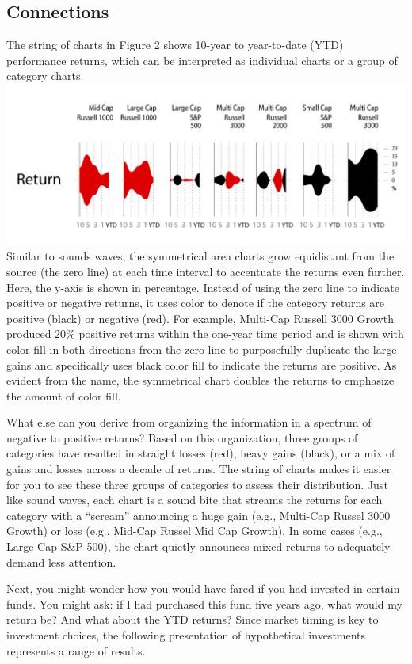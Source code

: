 \documentclass[]{book}
\theoremstyle{definition}
\theoremstyle{definition}
\theoremstyle{definition}
\theoremstyle{remark}
\begin{document}
\subsection{Connections}\label{connections}

The string of charts in Figure 2 shows 10-year to year-to-date (YTD)
performance returns, which can be interpreted as individual charts or a
group of category charts. \includegraphics{images/pattern-2.jpg} Similar
to sounds waves, the symmetrical area charts grow equidistant from the
source (the zero line) at each time interval to accentuate the returns
even further. Here, the y-axis is shown in percentage. Instead of using
the zero line to indicate positive or negative returns, it uses color to
denote if the category returns are positive (black) or negative (red).
For example, Multi-Cap Russell 3000 Growth produced 20\% positive
returns within the one-year time period and is shown with color fill in
both directions from the zero line to purposefully duplicate the large
gains and specifically uses black color fill to indicate the returns are
positive. As evident from the name, the symmetrical chart doubles the
returns to emphasize the amount of color fill.

What else can you derive from organizing the information in a spectrum
of negative to positive returns? Based on this organization, three
groups of categories have resulted in straight losses (red), heavy gains
(black), or a mix of gains and losses across a decade of returns. The
string of charts makes it easier for you to see these three groups of
categories to assess their distribution. Just like sound waves, each
chart is a sound bite that streams the returns for each category with a
``scream'' announcing a huge gain (e.g., Multi-Cap Russel 3000 Growth)
or loss (e.g., Mid-Cap Russel Mid Cap Growth). In some cases (e.g.,
Large Cap S\&P 500), the chart quietly announces mixed returns to
adequately demand less attention.

Next, you might wonder how you would have fared if you had invested in
certain funds. You might ask: if I had purchased this fund five years
ago, what would my return be? And what about the YTD returns? Since
market timing is key to investment choices, the following presentation
of hypothetical investments represents a range of results.
\end{document}
